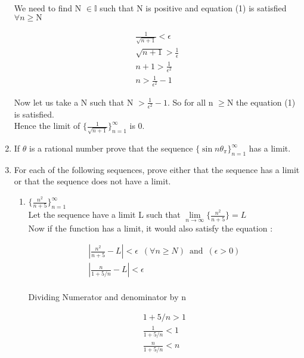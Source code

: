 \documentclass[11pt, letterpaper]{article}
\begin{document}
\begin{enumerate}
{\begin{enumerate}
{				We need to find N $\in \mathbb{I}$ such that N is positive and equation (1) is satisfied $\forall n \geq \mathrm{N}$
				
				\begin{eqnarray}
					\frac{1}{\sqrt{n+1}} < \epsilon \nonumber \\
					\sqrt{n+1} > \frac{1}{\epsilon} \nonumber \\
					n+1 > \frac{1}{\epsilon^2} \nonumber \\
					n > \frac{1}{\epsilon^2} - 1 
				\end{eqnarray}
				
				Now let us take a N such that N $> \frac{1}{\epsilon^2} -1 $. So for all n $\geq \mathrm{N}$ the equation (1) is satisfied. \\
				Hence the limit of $ \lbrace \frac{1}{\sqrt{n+1}} \rbrace_{n=1}^\infty $ is 0.
			}
		\end{enumerate}			
	}
	
	\item{If $\theta$ is a rational number prove that the sequence $\lbrace \sin{n \theta_{\pi}} \rbrace_{n=1}^\infty$ has a limit.}
	
	\item{For each of the following sequences, prove either that the sequence has a limit or that the sequence does not have a limit.
		\begin{enumerate}
			\item{ $\lbrace \frac{n^2}{n+5} \rbrace_{n=1}^\infty$\\
			Let the sequence have a limit L such that $\lim \limits_{n \to \infty}\lbrace \frac{n^2}{n+5} \rbrace = L$\\
			Now if the function has a limit, it would also satisfy the equation :\\
			
			\setcounter{equation}{0}
			
			\begin{eqnarray}
				\left| \frac{n^2}{n + 5} - L \right| < \epsilon \,\,\, (\forall n \geq N) \,\,\, \mathrm{and} \,\,\, (\epsilon > 0)\\
				\left| \frac{n}{1 + 5/n} - L \right| < \epsilon \nonumber \\
			\end{eqnarray}						
			
			\begin{center}
				Dividing Numerator and denominator by n
			\end{center}
			
			\begin{eqnarray}
				1 + 5/n > 1 \nonumber \\
				\frac{1}{1+5/n} < 1 \nonumber \\
				\frac{n}{1 + 5/n} < n 
			\end{eqnarray}
			
}
\end{enumerate}}
\end{enumerate}
\end{document}
